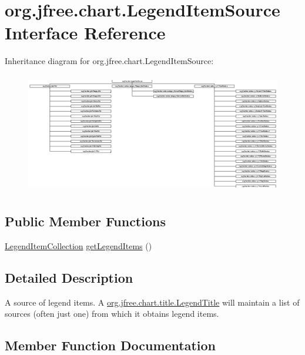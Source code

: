 \hypertarget{interfaceorg_1_1jfree_1_1chart_1_1_legend_item_source}{}\section{org.\+jfree.\+chart.\+Legend\+Item\+Source Interface Reference}
\label{interfaceorg_1_1jfree_1_1chart_1_1_legend_item_source}
Inheritance diagram for org.\+jfree.\+chart.\+Legend\+Item\+Source\+:\begin{figure}[H]
\begin{center}
\leavevmode
\includegraphics[height=5.292096cm]{interfaceorg_1_1jfree_1_1chart_1_1_legend_item_source}
\end{center}
\end{figure}
\subsection*{Public Member Functions}
\begin{DoxyCompactItemize}
\item 
\mbox{\hyperlink{classorg_1_1jfree_1_1chart_1_1_legend_item_collection}{Legend\+Item\+Collection}} \mbox{\hyperlink{interfaceorg_1_1jfree_1_1chart_1_1_legend_item_source_a224409463c4f7a8ef0e2a9df337e6d3b}{get\+Legend\+Items}} ()
\end{DoxyCompactItemize}


\subsection{Detailed Description}
A source of legend items. A \mbox{\hyperlink{classorg_1_1jfree_1_1chart_1_1title_1_1_legend_title}{org.\+jfree.\+chart.\+title.\+Legend\+Title}} will maintain a list of sources (often just one) from which it obtains legend items. 

\subsection{Member Function Documentation}
\mbox{\label{interfaceorg_1_1jfree_1_1chart_1_1_legend_item_source_a224409463c4f7a8ef0e2a9df337e6d3b}} 
